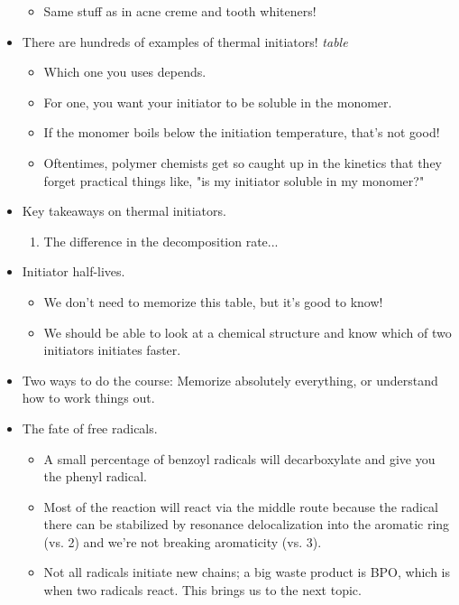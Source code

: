 \documentclass[../notes.tex]{subfiles}
\begin{document}
\begin{itemize}
\begin{itemize}
        \item Same stuff as in acne creme and tooth whiteners!
    \end{itemize}
    \item There are hundreds of examples of thermal initiators!
    \emph{table}
    \begin{itemize}
        \item Which one you uses depends.
        \item For one, you want your initiator to be soluble in the monomer.
        \item If the monomer boils below the initiation temperature, that's not good!
        \item Oftentimes, polymer chemists get so caught up in the kinetics that they forget practical things like, "is my initiator soluble in my monomer?"
    \end{itemize}
    \item Key takeaways on thermal initiators.
    \begin{enumerate}
        \item The difference in the decomposition rate...
    \end{enumerate}
    \item Initiator half-lives.
    \begin{itemize}
        \item We don't need to memorize this table, but it's good to know!
        \item We should be able to look at a chemical structure and know which of two initiators initiates faster.
    \end{itemize}
    \item Two ways to do the course: Memorize absolutely everything, or understand how to work things out.
    \item The fate of free radicals.
    \begin{itemize}
        \item A small percentage of benzoyl radicals will decarboxylate and give you the phenyl radical.
        \item Most of the reaction will react via the middle route because the radical there can be stabilized by resonance delocalization into the aromatic ring (vs. 2) and we're not breaking aromaticity (vs. 3).
        \item Not all radicals initiate new chains; a big waste product is BPO, which is when two radicals react. This brings us to the next topic.
    \end{itemize}

\end{itemize}
\end{document}
